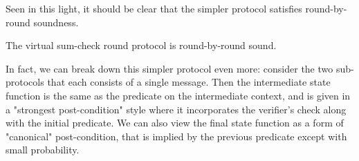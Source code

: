 Seen in this light, it should be clear that the simpler protocol satisfies round-by-round soundness.

\begin{theorem}
    The virtual sum-check round protocol is round-by-round sound.
    \label{thm:virtual_sumcheck_round_protocol_rbr_sound}
\end{theorem}

In fact, we can break down this simpler protocol even more: consider the two sub-protocols that each
consists of a single message. Then the intermediate state function is the same as the predicate on
the intermediate context, and is given in a "strongest post-condition" style where it incorporates
the verifier's check along with the initial predicate. We can also view the final state function as
a form of "canonical" post-condition, that is implied by the previous predicate except with small
probability.
